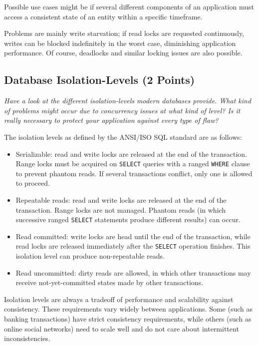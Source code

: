 \documentclass[a4paper,10pt]{article}
\begin{document}
Possible use cases might be if several different components of an application must
access a consistent state of an entity within a specific timeframe.

Problems are mainly write starvation; if read locks are requested continuously,
writes can be blocked indefinitely in the worst case, diminishing application performance.
Of course, deadlocks and similar locking issues are also possible.

\subsection{Database Isolation-Levels (2 Points)}

\emph{Have a look at the different isolation-levels modern databases provide. What kind of problems might
occur due to concurrency issues at what kind of level? Is it really necessary to protect your application
against every type of flaw?}

\vspace{3mm}

The isolation levels as defined by the ANSI/ISO SQL standard are as follows:

\begin{itemize}
\item Serializable: read and write locks are released at the end of the transaction. Range locks must
      be acquired on \lstinline|SELECT| queries with a ranged \lstinline|WHERE| clause to prevent phantom
      reads. If several transactions conflict, only one is allowed to proceed.
\item Repeatable reads: read and write locks are released at the end of the transaction. Range locks are
      not managed. Phantom reads (in which successive ranged \lstinline|SELECT| statements produce different
      results) can occur.
\item Read committed: write locks are head until the end of the transaction, while read locks are released
      immediately after the \lstinline|SELECT| operation finishes. This isolation level can produce non-repeatable
      reads.
\item Read uncommitted: dirty reads are allowed, in which other transactions may receive not-yet-committed states
      made by other transactions.
\end{itemize}

Isolation levels are always a tradeoff of performance and scalability against consistency.
These requirements vary widely between applications. Some (such as banking transactions) have
strict consistency requirements, while others (such as online social networks) need to scale well and
do not care about intermittent inconsistencies.
\end{document}
